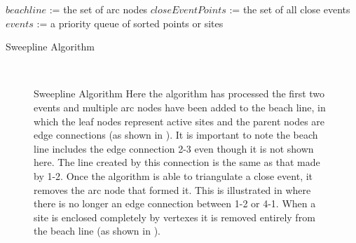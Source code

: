 \documentclass{egpubl}
\begin{document}
\algorithmspace
\begin{algorithm}
  \DontPrintSemicolon
  \BlankLine
  $beachline$ := the set of arc nodes\;
  $closeEventPoints$ := the set of all close events\;
  $events$ := a priority queue of sorted points or sites\;
\caption{Sweepline Algorithm}
\label{alg:sweepline-algorithm}
\end{algorithm}
\algorithmspace

\begin{figure}
  \centering
   \\
  \caption{Sweepline Algorithm
    \protect{} Here the algorithm has processed the first two events and multiple arc nodes have been added to the beach line, in which the leaf nodes represent active sites and the parent nodes are edge connections (as shown in \protect{}). It is important to note the beach line includes the edge connection 2-3 even though it is not shown here. The line created by this connection is the same as that made by 1-2.
    \protect{} Once the algorithm is able to triangulate a close event, it removes the arc node that formed it. This is illustrated in \protect{} where there is no longer an edge connection between 1-2 or 4-1.
    \protect{} When a site is enclosed completely by vertexes it is removed entirely from the beach line (as shown in \protect{}).
  }
  \label{fig:wavefront}
\end{figure}
\end{document}
